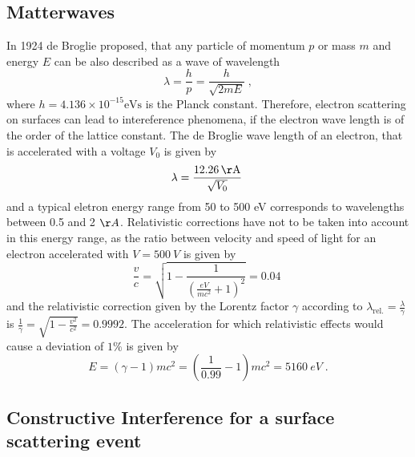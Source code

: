 \documentclass[a4paper]{scrartcl}
\numberwithin{equation}{section}
\numberwithin{figure}{section}
\numberwithin{table}{section}
\newcommand{\eq}[2]{\begin{equation}#1\label{#2}\end{equation}}
\begin{document}
\subsection{Matterwaves}
In 1924 de Broglie proposed, that any particle of momentum $p$ or mass $m$ and energy $E$ can be also described as a wave of wavelength 
\eq{\lambda = \frac{h}{p} =\frac{h}{\sqrt{2mE}} \;,}{lambda}
where $h=4.136\times 10^{-15} \text{eVs}$ is the Planck constant. Therefore, electron scattering on surfaces can lead to intereference phenomena, if the electron wave length is of the order of the lattice constant. The de Broglie wave length of an electron, that is accelerated with a voltage $V_0$ is given by 
\eq{\lambda= \frac{\SI{12.26}{\AA}}{\sqrt{V_0}} \; }{lV}
and a typical eletron energy range from 50 to 500 eV corresponds to wavelengths between 0.5 and 2 $\AA$. Relativistic corrections have not to be taken into account in this energy range, as the ratio between velocity and speed of light for an electron accelerated with $V = \SI{500}{V}$ is given by
\eq{\frac{v}{c}=\sqrt{1-\frac{1}{(\frac{eV}{mc^2}+1)^2}} =0.04 \; }{} 
and the relativistic correction given by the Lorentz factor $\gamma$ according to $\lambda_\text{rel.} = \frac{\lambda}{\gamma}$ is $\frac{1}{\gamma} = \sqrt{1-\frac{v^2}{c^2}}= 0.9992$. The acceleration for which relativistic effects would cause a deviation of $1\percent$ is given by
\eq{E=(\gamma -1)mc^2= \left(\frac{1}{0.99}-1\right)mc^2=\SI{5160}{eV}\;. }{}

\subsection{Constructive Interference for a surface scattering event}
\end{document}
